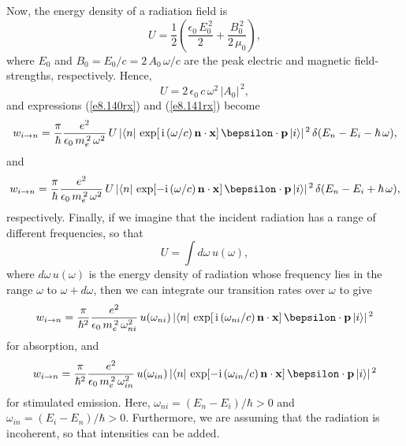 Now, the energy density of a radiation field
is
\begin{equation}
U = \frac{1}{2}\left(\frac{\epsilon_0\,E_0^{\,2}}{2}+ \frac{B_0^{\,2}}{2\,\mu_0}
\right),
\end{equation}
where $E_0$ and $B_0=E_0/c= 2\,A_0\,\omega/c$ are the peak electric and magnetic field-strengths,
respectively. Hence,
\begin{equation}
U = 2\,\epsilon_0\,c\,\omega^2\,|A_0|^{\,2},
\end{equation}
and expressions (\ref{e8.140rx}) and (\ref{e8.141rx})
become 
\begin{equation}\label{e8.140r}
w_{i\rightarrow n} = \frac{\pi}{\hbar} \frac{e^2}{\epsilon_0\,m_e^{\,2}\,\omega^2}\,
U\, |\langle n|\, \exp[\,{\rm i}\,(\omega/c)\,{\bf n}\cdot{\bf x}]\,
\bepsilon\cdot{\bf p} \,|i\rangle|^{\,2}\,
\delta(E_n-E_i -\hbar\,\omega),
\end{equation}
and
\begin{equation}\label{e8.141r}
w_{i\rightarrow n} = \frac{\pi}{\hbar} \frac{e^2}{\epsilon_0\,m_e^{\,2}\,\omega^2}\,
U\, |\langle n|\, \exp[-{\rm i}\,(\omega/c)\,{\bf n}\cdot{\bf x}]\,
\bepsilon\cdot{\bf p} \,|i\rangle|^{\,2}\,
\delta(E_n-E_i +\hbar\,\omega),
\end{equation}
respectively. 
Finally, if we imagine that the incident radiation has a range of different frequencies, so
that
\begin{equation}
U = \int d\omega\,u(\omega),
\end{equation}
where $d\omega\,u(\omega)$ is the energy density of radiation whose frequency lies in the range $\omega$
to $\omega+d\omega$, then we can integrate our transition rates over $\omega$ to give
\begin{equation}
w_{i\rightarrow n} = \frac{\pi}{\hbar^2} \frac{e^2}{\epsilon_0\,m_e^{\,2}\,\omega_{ni}^2}\,
u(\omega_{ni})\, |\langle n|\, \exp[\,{\rm i}\,(\omega_{ni}/c)\,{\bf n}\cdot{\bf x}]\,
\bepsilon\cdot{\bf p} \,|i\rangle|^{\,2}
\end{equation}
for absorption, and 
\begin{equation}
w_{i\rightarrow n} = \frac{\pi}{\hbar^2} \frac{e^2}{\epsilon_0\,m_e^{\,2}\,\omega_{in}^2}\,
u(\omega_{in})\, |\langle n|\, \exp[-{\rm i}\,(\omega_{in}/c)\,{\bf n}\cdot{\bf x}]\,
\bepsilon\cdot{\bf p} \,|i\rangle|^{\,2}
\end{equation}
for stimulated emission. Here, $\omega_{ni} = (E_n-E_i)/\hbar>0$ and $\omega_{in} = (E_i-E_n)/\hbar>0$. 
Furthermore, we are assuming that the radiation is incoherent, so that intensities can be
added. 

